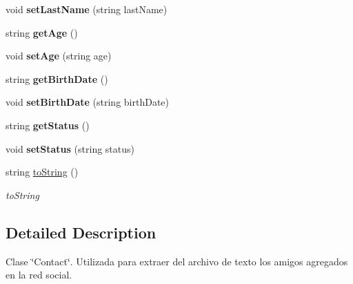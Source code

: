 \begin{DoxyCompactItemize}
\item 
\mbox{\label{class_proyecto1__1096917_1_1_contact_a8e874088b5626c54691a2e09782d6425}} 
void {\bfseries set\+Last\+Name} (string last\+Name)
\item 
\mbox{\label{class_proyecto1__1096917_1_1_contact_aa2c6686b8fea9a2ee250282aaaaca4e8}} 
string {\bfseries get\+Age} ()
\item 
\mbox{\label{class_proyecto1__1096917_1_1_contact_ac4ff19459ba600290ef42009e8618044}} 
void {\bfseries set\+Age} (string age)
\item 
\mbox{\label{class_proyecto1__1096917_1_1_contact_a69830372183b3b2c9ea29fddb26448ca}} 
string {\bfseries get\+Birth\+Date} ()
\item 
\mbox{\label{class_proyecto1__1096917_1_1_contact_a88e5a65983010ae1772338a55dc60bef}} 
void {\bfseries set\+Birth\+Date} (string birth\+Date)
\item 
\mbox{\label{class_proyecto1__1096917_1_1_contact_adcf2884f5e6a92bbce92b3e87ba713cd}} 
string {\bfseries get\+Status} ()
\item 
\mbox{\label{class_proyecto1__1096917_1_1_contact_a3a039163a72bef3ff198150e62b305ba}} 
void {\bfseries set\+Status} (string status)
\item 
string \mbox{\hyperlink{class_proyecto1__1096917_1_1_contact_a7af16c68b374d08887105c583031c23a}{to\+String}} ()
\begin{DoxyCompactList}\small\item\em to\+String \end{DoxyCompactList}\end{DoxyCompactItemize}


\subsection{Detailed Description}
Clase \char`\"{}\+Contact\char`\"{}. Utilizada para extraer del archivo de texto los amigos agregados en la red social. 



